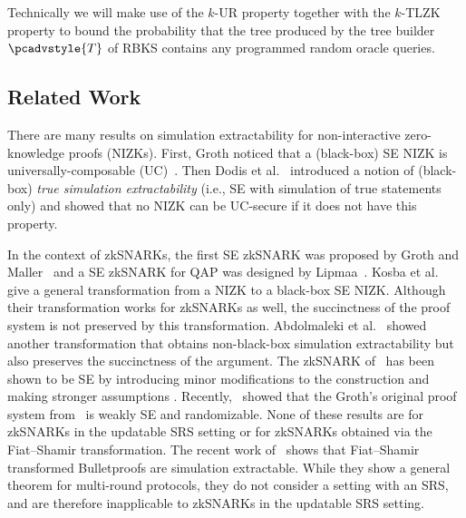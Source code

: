 \documentclass[10pt]{llncs}
\newcommand{\tdv}{\pcadvstyle{T}}
\begin{document}



Technically we will make use of the $k$-UR property together with the $k$-TLZK property to bound the probability that the tree produced by the tree builder $\tdv$ of RBKS contains any programmed random oracle queries.

\subsection{Related Work}
There are many results on simulation extractability for
non-interactive zero-knowledge proofs (NIZKs). First, Groth \cite{AC:Groth07}
noticed that a (black-box) SE NIZK is
universally-composable (UC)~\cite{EPRINT:Canetti00}. Then Dodis et al.~\cite{AC:DHLW10} introduced a
notion of (black-box) \emph{true simulation extractability} (i.e., SE with simulation of true statements only) and showed that no
NIZK can be UC-secure if it does not have this property. 

In the context of zkSNARKs, the first
SE zkSNARK was proposed by Groth and Maller~\cite{C:GroMal17} and a SE
zkSNARK for QAP was designed by Lipmaa~\cite{EPRINT:Lipmaa19a}.
Kosba et
al.~\cite{EPRINT:KZMQCP15} give a general transformation from a NIZK to a
black-box SE NIZK. Although their transformation works for zkSNARKs as well,
the succinctness of the proof system is not preserved by this transformation.
Abdolmaleki et al.~\cite{CCS:AbdRamSla20short} showed another transformation that
obtains non-black-box simulation extractability but also preserves
the succinctness of the argument. 
The zkSNARK of~\cite{EC:Groth16} has been shown to be SE by introducing minor modifications to the construction and making
stronger assumptions \cite{EPRINT:BowGab18,EPRINT:AtaBag19}. Recently,~\cite{EPRINT:BKSV20} showed that the
Groth's original proof system from~\cite{EC:Groth16} is weakly SE and
randomizable. None of these results are for zkSNARKs in the updatable SRS setting or for zkSNARKs obtained via the Fiat--Shamir transformation. The recent work of~\cite{cryptoeprint:GOPTT22} shows that Fiat--Shamir transformed Bulletproofs are simulation extractable. While they show a general theorem for multi-round protocols, they do not consider a setting with an SRS, and are therefore inapplicable to zkSNARKs in the updatable SRS setting.
\end{document}
